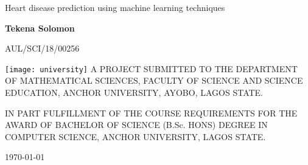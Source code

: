\begin{titlepage}
	\begin{center}
		\vspace*{1cm}
		
		\huge{Heart disease prediction using machine learning techniques}
		
		
		\vspace{1.5cm}
		
		\large{\textbf{Tekena Solomon}}
		
		\vspace{0.5cm}
		AUL/SCI/18/00256
		
		\vfill
		\texttt{[image: university]}
		\vfill
		{A PROJECT SUBMITTED TO THE DEPARTMENT OF MATHEMATICAL SCIENCES, FACULTY OF SCIENCE AND SCIENCE EDUCATION, ANCHOR UNIVERSITY, AYOBO, LAGOS STATE.}
		\vfill
		
		{IN PART FULFILLMENT OF THE COURSE REQUIREMENTS FOR THE AWARD OF BACHELOR OF SCIENCE (B.Sc. HONS) DEGREE IN COMPUTER SCIENCE, ANCHOR UNIVERSITY, LAGOS STATE.
		}
		\vspace{0.8cm}


		
		\vspace{0.8cm}
		

		\today
		
	\end{center}
\end{titlepage}